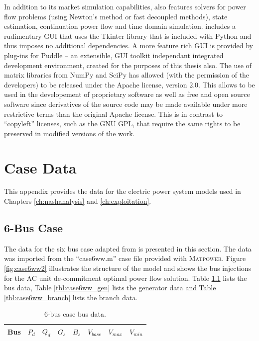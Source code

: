 In addition to its market simulation capabilities, \pylon also features solvers
for power flow problems (using Newton's method or fast decoupled methods),
state estimation, continuation power flow and time domain simulation.  \pylon
includes a rudimentary GUI that uses the Tkinter library that is included
with Python and thus imposes no additional dependencies.  A more feature
rich GUI is provided by plug-ins for Puddle -- an extensible, GUI
toolkit independant integrated development environment, created for the
purposes of this thesis also.  The use of matrix libraries from NumPy and
SciPy has allowed \pylon (with the permission of the \matpower developers) to
be released under the Apache license, version 2.0. This allows \pylon to be
used in the developement of proprietary software as well as free and open
source software since derivatives of the source code may be made available
under more restrictive terms than the original Apache license.  This is in
contrast to ``copyleft'' licenses, such as the GNU GPL, that require the same
rights to be preserved in modified versions of the work.

\chapter{Case Data}
This appendix provides the data for the electric power system models used in
Chapters \ref{ch:nashanalysis} and \ref{ch:exploitation}.

\section{6-Bus Case}
\label{adx:case6ww}
The data for the six bus case adapted from  is presented in this section.  The data was imported from the
``case6ww.m'' case file provided with \textsc{Matpower}.  Figure
\ref{fig:case6ww2} illustrates the structure of the model and shows the bus
injections for the AC unit de-commitment optimal power flow solution.  Table
\ref{tbl:case6ww_bus} lists the bus data, Table \ref{tbl:case6ww_gen} lists
the generator data and Table \ref{tbl:case6ww_branch} lists the branch data.


%

\begin{table}[h]
\begin{center}
\begin{tabular}{c|c|c|c|c|c|c|c}
\hline
Bus &$P_d$ &$Q_d$ &$G_s$ &$B_s$ &$V_{base}$ &$V_{max}$ &$V_{min}$\\
\hline\hline

\hline
\end{tabular}
\caption{6-bus case bus data.}
\label{tbl:case6ww_bus}
\end{center}
\end{table}

